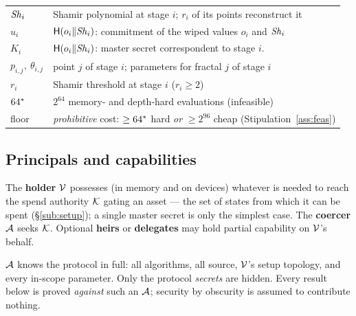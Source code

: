 \begin{tabularx}{\linewidth}{@{}l X@{}}
$\mathit{Sh}_i$ & Shamir polynomial at stage $i$; $r_i$ of its points reconstruct it \\
$u_i$ & $\mathsf{H}(o_{i}\|\mathit{Sh}_{i})$: commitment of the wiped values $o_{i}$ and $\mathit{Sh}_{i}$ \\
$K_i$ & $\mathsf{H}(o_{i}\|\mathit{Sh}_{i})$: master secret correspondent to stage $i$. \\
$p_{i,j},\ \theta_{i,j}$ & point $j$ of stage $i$; parameters for fractal $j$ of stage $i$ \\
$r_i$ & Shamir threshold at stage $i$ ($r_i \ge 2$) \\
$64^{*}$ & $2^{64}$ memory- and depth-hard evaluations (infeasible) \\
floor & \emph{prohibitive} cost: $\ge 64^{*}$ hard \emph{or} $\ge 2^{96}$ cheap (Stipulation~\ref{ass:feas}) \\
\bottomrule
\end{tabularx}
\endgroup

\subsection{Principals and capabilities}

\begin{definition}[Principals]
The \textbf{holder} $\mathcal{V}$ possesses (in memory and on devices) whatever is
needed to reach the spend authority $\mathcal{K}$ gating an asset --- the set of states
from which it can be spent (\S\ref{sub:setup}); a single master secret is only the
simplest case. The \textbf{coercer} $\mathcal{A}$ seeks $\mathcal{K}$. Optional \textbf{heirs} or \textbf{delegates} may hold
partial capability on $\mathcal{V}$'s behalf.
\end{definition}

\begin{assumption}\label{ass:kerckhoffs}
$\mathcal{A}$ knows the protocol in full: all algorithms, all source, $\mathcal{V}$'s
setup topology, and every in-scope parameter. Only the protocol \emph{secrets}
are hidden. Every result below is proved \emph{against} such an $\mathcal{A}$;
security by obscurity is assumed to contribute nothing.
\end{assumption}

